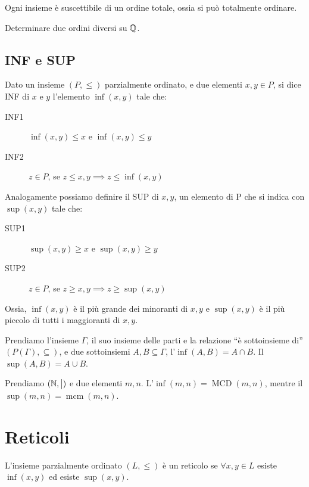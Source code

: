 \begin{theorem}
Ogni insieme \`e suscettibile di un ordine totale, ossia si pu\`o totalmente ordinare.
\end{theorem}

\begin{esercizio}
Determinare due ordini diversi su $\mathbb{Q}$.
\end{esercizio}

\subsection{INF e SUP}

\begin{defn}[INF]
Dato un insieme $(P, \leq)$ parzialmente ordinato, e due elementi $x,y \in P$, si dice INF di $x$ e $y$ l'elemento $\inf(x,y)$ tale che:
\begin{description}
    \item[INF1\label{itm:inf1}] $\inf(x,y) \leq x $ e $ \inf(x,y) \leq y$
    \item[INF2\label{itm:inf2}] $z \in P$, se $ z \leq x, y \implies z \leq \inf(x,y)$
\end{description}
\end{defn}
\begin{defn}[SUP]
Analogamente possiamo definire il SUP di $x,y$, un elemento di P che si indica con $\sup(x,y)$ tale che:
\begin{description}
    \item[SUP1\label{itm:sup1}] $\sup(x,y) \geq x $ e $ \sup(x,y) \geq y$
    \item[SUP2\label{itm:sup2}] $z \in P$, se $ z \geq x, y \implies z \geq \sup(x,y)$
\end{description}
\end{defn}

Ossia, $\inf(x,y)$ \`e il pi\`u grande dei minoranti di $x,y$ e $\sup(x,y)$ \`e il pi\`u piccolo di tutti i maggioranti di $x, y$.

Prendiamo l'insieme $\Gamma$, il suo insieme delle parti e la relazione ``\`e sottoinsieme di'' $(P(\Gamma),\subseteq)$, e due sottoinsiemi $A, B \subseteq \Gamma$, l'$\inf(A,B) = A \cap B$. Il $\sup(A,B) = A \cup B$.

Prendiamo $(\mathbb{N},\bigm|)$ e due elementi $m, n$. L'$\inf(m,n) = \operatorname{MCD}(m,n)$, mentre il $\sup(m,n) = \operatorname{mcm}(m,n)$.

\section{Reticoli}
\begin{defn}[Reticolo]
L'insieme parzialmente ordinato $(L, \leq)$ \`e un reticolo se $\forall x, y \in L $ esiste $\inf(x,y)$ ed esiste $\sup(x,y)$.
\end{defn}

